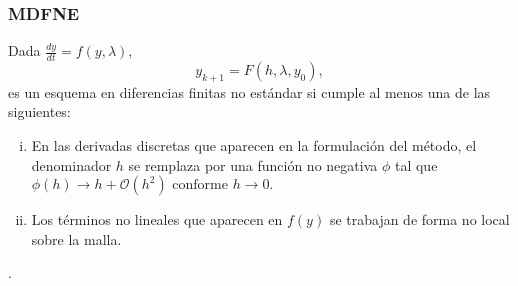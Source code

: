 \begin{bibunit}[aalpha]
  \begin{frame}
    \frametitle{MDFNE}
    \begin{Definicion}
    Dada $\displaystyle \frac{dy}{dt} = f(y,\lambda)$,
    $$\displaystyle y_{k+1}=F(h,\lambda,y_0),$$
    es  un esquema  en diferencias finitas no  est\'andar si cumple  al menos una de las siguientes:
    \begin{enumerate}[(i)]
    \item
        En las derivadas discretas que aparecen en la formulaci\'on del m\'etodo, el denominador $h$ se
        remplaza  por una funci\'on no negativa $\phi$ tal que
      $
        \phi(h)\to h+\mathcal{O}(h^2) \text{ conforme } h\to 0.
      $
      \item
        Los t\'erminos no lineales que aparecen en $f(y)$  se trabajan de forma no local sobre la malla.
      \end{enumerate}
      \cite{ibijola2008nonstandard}.
    \end{Definicion}
  \end{frame}
\end{bibunit}
